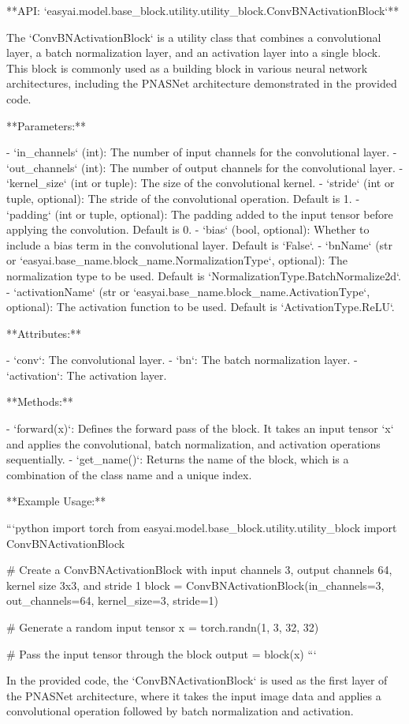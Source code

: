 **API: `easyai.model.base_block.utility.utility_block.ConvBNActivationBlock`**

The `ConvBNActivationBlock` is a utility class that combines a convolutional layer, a batch 
normalization layer, and an activation layer into a single block. This block is commonly used as a 
building block in various neural network architectures, including the PNASNet architecture 
demonstrated in the provided code.

**Parameters:**

- `in_channels` (int): The number of input channels for the convolutional layer.
- `out_channels` (int): The number of output channels for the convolutional layer.
- `kernel_size` (int or tuple): The size of the convolutional kernel.
- `stride` (int or tuple, optional): The stride of the convolutional operation. Default is 1.
- `padding` (int or tuple, optional): The padding added to the input tensor before applying 
    the convolution. Default is 0.
- `bias` (bool, optional): Whether to include a bias term in the convolutional layer. Default is 
    `False`.
- `bnName` (str or `easyai.base_name.block_name.NormalizationType`, optional): The normalization 
    type to be used. Default is `NormalizationType.BatchNormalize2d`.
- `activationName` (str or `easyai.base_name.block_name.ActivationType`, optional): The activation 
    function to be used. Default is `ActivationType.ReLU`.

**Attributes:**

- `conv`: The convolutional layer.
- `bn`: The batch normalization layer.
- `activation`: The activation layer.

**Methods:**

- `forward(x)`: Defines the forward pass of the block. It takes an input tensor `x` and applies the 
    convolutional, batch normalization, and activation operations sequentially.
- `get_name()`: Returns the name of the block, which is a combination of the class name and a unique 
    index.

**Example Usage:**

```python
import torch
from easyai.model.base_block.utility.utility_block import ConvBNActivationBlock

# Create a ConvBNActivationBlock with input channels 3, output channels 64, kernel size 3x3, and 
    stride 1
block = ConvBNActivationBlock(in_channels=3, out_channels=64, kernel_size=3, stride=1)

# Generate a random input tensor
x = torch.randn(1, 3, 32, 32)

# Pass the input tensor through the block
output = block(x)
```

In the provided code, the `ConvBNActivationBlock` is used as the first layer of the PNASNet 
architecture, where it takes the input image data and applies a convolutional operation followed by 
batch normalization and activation.
